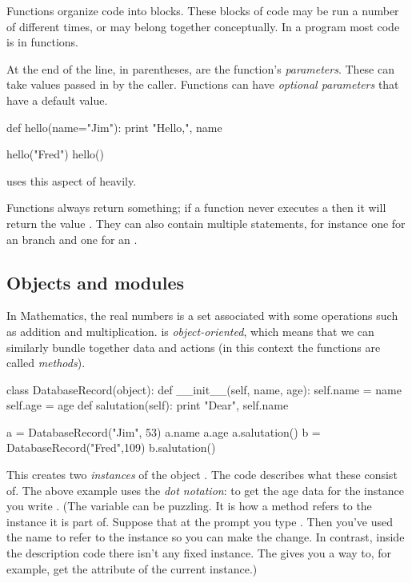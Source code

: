 Functions organize code into blocks. 
These blocks of code may be 
run a number of different times, or may belong together conceptually. 
In a \python{} program most code is in functions. 

At the end of the  line, in parentheses, are
the function's \textit{parameters}. 
These can take values 
passed in by the caller.
Functions can have \textit{optional parameters} that have a default value.
\begin{pythonoutput}
def hello(name="Jim"):
    print "Hello,", name

hello("Fred")
hello()
\end{pythonoutput}
\noindent
\Sage{} uses this aspect of \python{} heavily.

Functions always return something; 
if a function never executes a  then it will
return the value .
They can also contain multiple  statements, for instance 
one for an  branch and one for an .




\subsection{Objects and modules}
In Mathematics, the real numbers is a set associated with some operations
such as addition and multiplication.
\python{} is \textit{object-oriented}, which means that we can similarly bundle
together data and actions (in this context the functions are called 
\textit{methods}).
\begin{pythonoutput}
class DatabaseRecord(object):
    def __init__(self, name, age):
        self.name = name
        self.age = age
    def salutation(self):
        print "Dear", self.name

a = DatabaseRecord("Jim", 53)
a.name
a.age
a.salutation()
b = DatabaseRecord("Fred",109)
b.salutation()
\end{pythonoutput}
\noindent
This creates two \textit{instances} of the object 
.
The  code describes what these consist of.
The above example uses the \textit{dot notation}:
to get the age data for the instance 
you write 
.
(The \protect{} variable 
can  be puzzling.
It is how a method refers to the instance it is part of.
Suppose that at the prompt you type .
Then you've used the name  
to refer to the instance so you can
make the change.
In contrast,
inside the  description code there isn't any fixed instance. 
The  gives you a way to, for example, 
get the  attribute
of the current instance.)

